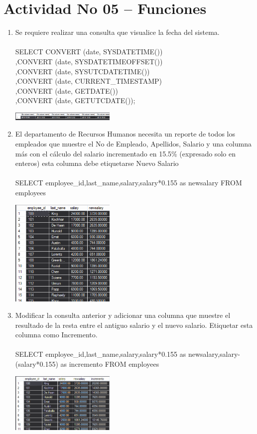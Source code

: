 \section{Actividad No 05 – Funciones}
	
\begin{enumerate}[1.]
	\item Se requiere realizar una consulta que visualice la fecha del sistema.
	\\
	\\SELECT CONVERT (date, SYSDATETIME())
	\\,CONVERT (date, SYSDATETIMEOFFSET())
	\\,CONVERT (date, SYSUTCDATETIME())
	\\,CONVERT (date, CURRENT\_TIMESTAMP)
	\\,CONVERT (date, GETDATE())
    	\\,CONVERT (date, GETUTCDATE());
	\begin{center}
	\includegraphics[width=5cm]{./Imagenes/451}
	\end{center}
	
	\item El departamento de Recursos Humanos necesita un reporte de todos los empleados que muestre el No de Empleado, Apellidos, Salario y una columna más con el cálculo del salario incrementado en 15.5\% (expresado solo en enteros) esta columna debe etiquetarse Nuevo Salario
	\\
	\\SELECT employee\_id,last\_name,salary,salary*0.155 as newsalary FROM employees
	\begin{center}
	\includegraphics[width=5cm]{./Imagenes/452}
	\end{center}

	\item Modificar la consulta anterior y adicionar una columna que muestre el resultado de la resta entre el antiguo salario y el nuevo salario. Etiquetar esta columna como Incremento.
	\\
	\\SELECT employee\_id,last\_name,salary,salary*0.155 as newsalary,salary-(salary*0.155) as incremento FROM employees
	\begin{center}
	\includegraphics[width=5cm]{./Imagenes/453}
	\end{center}


\end{enumerate}
